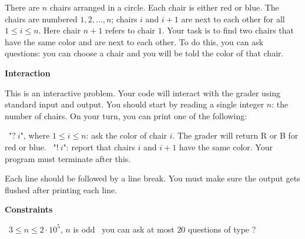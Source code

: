 There are $n$ chairs arranged in a circle. Each chair is either red or blue. The chairs are numbered $1, 2,\dots, n$; chairs $i$ and $i+1$ are next to each other for all $1 \le i \le n$. Here chair $n+1$ refers to chair $1$.
Your task is to find two chairs that have the same color and are next to each other.
To do this, you can ask questions: you can choose a chair and you will be told the color of that chair.

\vspace{0.3cm}\noindent\textbf{Interaction}

This is an interactive problem. Your code will interact with the grader using standard input and output. You should start by reading a single integer $n$: the number of chairs.
On your turn, you can print one of the following:

\textbullet\ "$?\ i$", where $1 \le i \le n$: ask the color of chair $i$. The grader will return R or B for red or blue.
\textbullet\ "$!\ i$": report that chairs $i$ and $i+1$ have the same color. Your program must terminate after this.

Each line should be followed by a line break. You must make sure the output gets flushed after printing each line.

\vspace{0.3cm}\noindent\textbf{Constraints}

\textbullet\ $3 \le n \le 2 \cdot 10^5$, $n$ is odd
\textbullet\ you can ask at most $20$ questions of type $?$